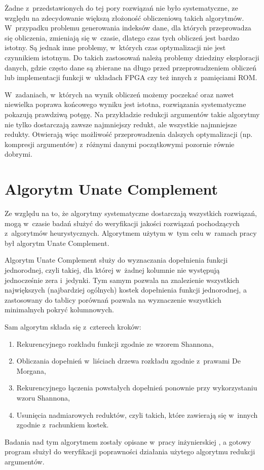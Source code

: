 Żadne z~przedstawionych do tej pory rozwiązań nie było systematyczne,
ze względu na zdecydowanie większą złożoność obliczeniową takich algorytmów.
W~przypadku problemu generowania indeksów dane,
dla których przeprowadza się obliczenia,
zmieniają się w~czasie,
dlatego czas tych obliczeń jest bardzo istotny.
Są jednak inne problemy,
w~których czas optymalizacji nie jest czynnikiem istotnym.
Do takich zastosowań należą problemy dziedziny eksploracji danych,
gdzie często dane są zbierane na długo przed przeprowadzeniem obliczeń
lub implementacji funkcji w~układach FPGA czy też innych z~pamięciami ROM.

W~zadaniach, w~których na wynik obliczeń możemy poczekać oraz nawet niewielka poprawa końcowego wyniku jest istotna,
rozwiązania systematyczne pokazują prawdziwą potęgę.
Na przykładzie redukcji argumentów takie algorytmy nie tylko dostarczają zawsze najmniejszy redukt,
ale wszystkie najmniejsze redukty.
Otwierają więc możliwość przeprowadzenia dalszych optymalizacji (np. kompresji argumentów) z~różnymi danymi początkowymi pozornie równie dobrymi.

\section{Algorytm Unate Complement}

Ze względu na to,
że algorytmy systematyczne dostarczają wszystkich rozwiązań,
mogą w~czasie badań służyć do weryfikacji jakości rozwiązań pochodzących z~algorytmów heurystycznych.
Algorytmem użytym w~tym celu w~ramach pracy był algorytm Unate Complement.

Algorytm Unate Complement służy do wyznaczania dopełnienia funkcji jednorodnej,
czyli takiej,
dla której w~żadnej kolumnie nie występują jednocześnie zera i~jedynki.
Tym samym pozwala na znalezienie wszystkich największych (najbardziej ogólnych) kostek dopełnienia funkcji jednorodnej,
a zastosowany do tablicy porównań pozwala na wyznaczenie wszystkich minimalnych pokryć kolumnowych.

Sam algorytm składa się z~czterech kroków:
\begin{enumerate}
\item Rekurencyjnego rozkładu funkcji zgodnie ze wzorem Shannona,
\item Obliczania dopełnień w~liściach drzewa rozkładu zgodnie z~prawami De Morgana,
\item Rekurencyjnego łączenia powstałych dopełnień ponownie przy wykorzystaniu wzoru Shannona,
\item Usunięcia nadmiarowych reduktów,
czyli takich,
które zawierają się w~innych zgodnie z~rachunkiem kostek.
\end{enumerate}
Badania nad tym algorytmem zostały opisane w~pracy inżynierskiej \cite{inzynierka},
a gotowy program służył do weryfikacji poprawności działania użytego algorytmu redukcji argumentów.
